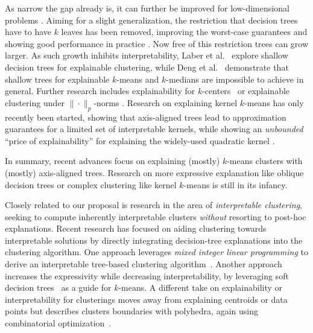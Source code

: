 \documentclass[a4paper,11pt]{article}
\begin{document}
As narrow the gap already is, 
it can further be improved for low-dimensional problems \cite{charikar2022near,laber2021price}. 
Aiming for a slight generalization, the restriction that decision trees have to have $k$ leaves has been removed, improving the worst-case guarantees \cite{makarychev2022explainable} and 
showing good performance in practice \cite{frost2020exkmc}. 
Now free of this restriction trees can grow larger.
As such growth inhibits interpretability, 
Laber et al.~\cite{laber2023nearly} explore shallow decision trees for explainable clustering, 
while Deng et al.~\cite{deng2023impossibility} demonstrate 
that shallow trees for explainable $k$-means and $k$-medians are impossible to achieve in general. 
Further research includes explainability for $k$-centers~\cite{laber2021price} or 
explainable clustering under $\|\cdot\|_p$-norms \cite{gamlath2021explainable}. 
Research on explaining kernel $k$-means has only recently been started, 
showing that axis-aligned trees lead to approximation guarantees for a limited set of interpretable kernels, 
while showing an \emph{unbounded} ``price of explainability'' 
for explaining the widely-used quadratic kernel \cite{fleissner2024explaining}.

In summary, recent advances focus on explaining (mostly) $k$-means clusters with (mostly) axis-aligned trees. 
Research on more expressive explanation like oblique decision trees or complex clustering 
like kernel $k$-means is still in its infancy.

Closely related to our proposal is research in the area of \emph{interpretable clustering},
seeking to compute inherently interpretable clusters \emph{without} resorting to post-hoc explanations.
Recent research has focused on aiding clustering towards interpretable solutions by directly integrating 
decision-tree explanations into the clustering algorithm.
One approach leverages \emph{mixed integer linear programming} 
to derive an interpretable tree-based clustering algorithm~\cite{bertsimas2021interpretable}. 
Another approach increases the expressivity while decreasing interpretability, 
by leveraging soft decision trees~\cite{cohen2023interpretable} as a guide for $k$-means. 
A different take on explainability or interpretability for clusterings 
moves away from explaining centroids or data points 
but describes clusters boundaries with poly\-hedra, 
again using combinatorial optimization~\cite{lawless2023polyhedral}. 
\end{document}
